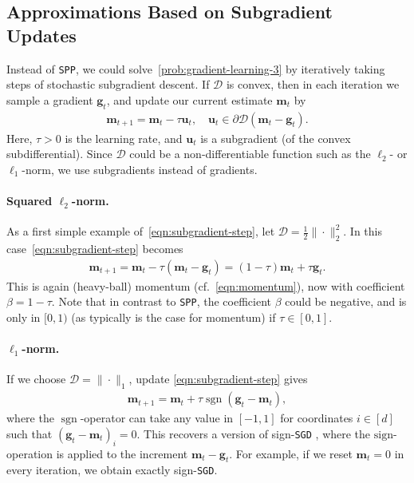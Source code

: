 \documentclass[10pt]{article} %
\renewcommand{\vec}[1]{\bm{#1}}
\DeclareMathOperator{\sgn}{sgn}
\newcommand{\norm}[1]{ \|#1 \|}
\newcommand{\dist}{\mathcal{D}}
\newcommand{\SGD}{\texttt{SGD}}
\newcommand{\SPP}{\texttt{SPP}}
\begin{document}
%



\subsection{Approximations Based on Subgradient Updates}
\label{sec:SGDmedian}
Instead of \SPP{}, we could solve~\eqref{prob:gradient-learning-3} by iteratively taking steps of stochastic subgradient descent. If $\dist$ is convex, then in each iteration we sample a gradient $\vec{g}_t$, and update our current estimate $\vec{m}_t$ by
\begin{align}\label{eqn:subgradient-step}
    \vec{m}_{t+1} = \vec{m}_t - \tau\vec{u}_t,\quad \vec{u}_t \in \partial \dist(\vec{m}_t - \vec{g}_t).
\end{align}
Here, $\tau >0$ is the learning rate, and $\vec{u}_t$ is a subgradient (of the convex subdifferential). Since $\dist$ could be a non-differentiable function such as the $\ell_2$- or $\ell_1$-norm, we use subgradients instead of gradients. 

\paragraph{Squared $\ell_2$-norm.} As a first simple example of~\eqref{eqn:subgradient-step}, let $\dist = \tfrac{1}{2}\norm{\cdot}_2^2.$ In this case~\eqref{eqn:subgradient-step} becomes
\begin{align} \label{eq:mom1}
    \vec{m}_{t+1} = \vec{m}_t - \tau(\vec{m}_t - \vec{g}_t) = (1-\tau) \vec{m}_t + \tau\vec{g}_t.
\end{align}
This is again (heavy-ball) momentum (cf.\ \ref{eqn:momentum}), now with coefficient $\beta=1-\tau$. Note that in contrast to \SPP{}, the coefficient $\beta$ could be negative, and is only in $[0,1)$ (as typically is the case for momentum) if $\tau \in [0,1]$.  

\paragraph{$\ell_1$-norm.} If we choose $\dist= \|\cdot\|_1$, update \eqref{eqn:subgradient-step} gives
\begin{align*}
    \vec{m}_{t+1} = \vec{m}_t + \tau\sgn(\vec{g}_t - \vec{m}_t),
\end{align*}
where the $\sgn$-operator can take any value in $[-1,1]$ for coordinates $i\in [d]$ such that $(\vec{g}_{t}-\vec{m}_{t})_i=0$.
%
This recovers a version of sign-\SGD{} \citep{Riedmiller1993,pmlr-v80-bernstein18a}, where the $\mathrm{sign}$-operation is applied to the increment $\vec{m}_t - \vec{g}_t$. For example, if we reset $\vec{m}_t=0$ in every iteration, we obtain exactly sign-\SGD{}.
\end{document}
